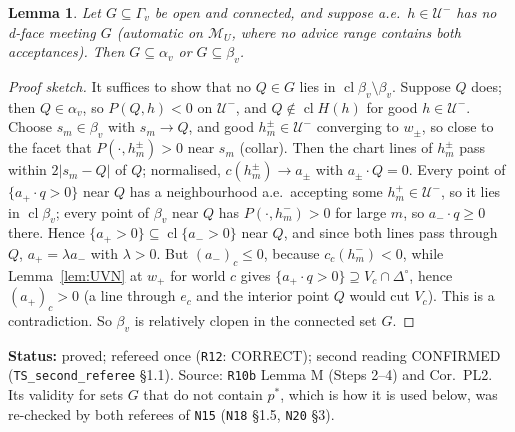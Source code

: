 \documentclass[11pt]{article}
\newtheorem{lemma}[theorem]{Lemma}
\theoremstyle{definition}
\theoremstyle{remark}
\newcommand{\Di}{\Delta^{\circ}}
\newcommand{\M}{\mathcal M}
\newcommand{\cl}{\operatorname{cl}}
\newcommand{\src}[1]{\texttt{#1}}
\newcommand{\status}[1]{\par\smallskip\noindent\textbf{Status:} #1\par\smallskip}
\begin{document}
\begin{lemma}\label{lem:PL2}
Let $G\subseteq\Gamma_v$ be open and connected, and suppose a.e.\ $h\in\mathcal U^-$ has no d-face meeting $G$ (automatic on $\M_U$, where no advice range contains both acceptances). Then $G\subseteq\alpha_v$ or $G\subseteq\beta_v$.
\end{lemma}
\begin{proof}[Proof sketch]
It suffices to show that no $Q\in G$ lies in $\cl\beta_v\setminus\beta_v$. Suppose $Q$ does; then $Q\in\alpha_v$, so $P(Q,h)<0$ on $\mathcal U^-$, and $Q\notin\cl H(h)$ for good $h\in\mathcal U^-$. Choose $s_m\in\beta_v$ with $s_m\to Q$, and good $h^\pm_m\in\mathcal U^-$ converging to $w_\pm$, so close to the facet that $P(\cdot,h^\pm_m)>0$ near $s_m$ (collar). Then the chart lines of $h^\pm_m$ pass within $2|s_m-Q|$ of $Q$; normalised, $c(h^\pm_m)\to a_\pm$ with $a_\pm\cdot Q=0$. Every point of $\{a_+\cdot q>0\}$ near $Q$ has a neighbourhood a.e.\ accepting some $h^+_m\in\mathcal U^-$, so it lies in $\cl\beta_v$; every point of $\beta_v$ near $Q$ has $P(\cdot,h^-_m)>0$ for large $m$, so $a_-\cdot q\ge0$ there. Hence $\{a_+>0\}\subseteq\cl\{a_->0\}$ near $Q$, and since both lines pass through $Q$, $a_+=\lambda a_-$ with $\lambda>0$. But $(a_-)_c\le0$, because $c_c(h^-_m)<0$, while Lemma~\ref{lem:UVN} at $w_+$ for world $c$ gives $\{a_+\cdot q>0\}\supseteq V_c\cap\Di$, hence $(a_+)_c>0$ (a line through $e_c$ and the interior point $Q$ would cut $V_c$). This is a contradiction. So $\beta_v$ is relatively clopen in the connected set $G$.
\end{proof}
\status{proved; refereed once (\src{R12}: CORRECT); second reading CONFIRMED (\src{TS\_second\_referee} \S1.1). Source: \src{R10b} Lemma M (Steps 2--4) and Cor.~PL2. Its validity for sets $G$ that do not contain $p^*$, which is how it is used below, was re-checked by both referees of \src{N15} (\src{N18} \S1.5, \src{N20} \S3).}
\end{document}
